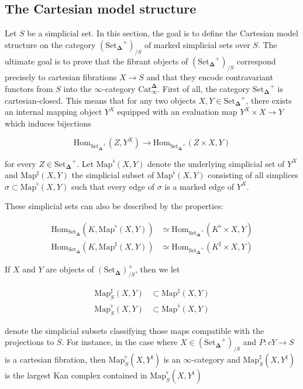 \documentclass[12pt]{amsart}
\newcommand{\8}{\ensuremath{\infty}}
\newcommand{\SSet}{\ensuremath{\text{Set}_{\boldsymbol{\Delta}}}}
\newcommand{\Catinfdel}{\ensuremath{\text{Cat}^{\boldsymbol{\Delta}}_{\infty}}}
\newcommand{\Map}{\ensuremath{\text{Map}}}
\newcommand{\Hom}{\ensuremath{\text{Hom}}}
\begin{document}
\subsection{The Cartesian model structure}
Let $S$ be a simplicial set. In this section, the goal is to define the Cartesian model structure on the category $(\SSet^+)_{/S}$ of marked simplicial sets over $S$. The ultimate goal is to prove that the fibrant objects of $(\SSet^+)_{/S}$ correspond precisely to cartesian fibrations $X \rightarrow S$ and that they encode contravariant functors from $S$ into the \8-category \Catinfdel.
First of all, the category $\SSet^+$ is cartesian-closed. This means that for any two objects $X, Y\in \SSet^+$, there exists an internal mapping object $Y^X$ equipped with an evaluation map $Y^X\times X \rightarrow Y$ which induces bijections

$$
  \Hom_{\SSet^+}(Z, Y^X) \rightarrow \Hom_{\SSet^+}(Z\times X, Y)
$$

for every $Z \in \SSet^+$. Let $\Map^\flat(X, Y)$ denote the underlying simplicial set of $Y^X$ and $\Map^\sharp(X, Y)$ the simplicial subset of $\Map^\flat(X, Y)$ consisting of all simplices $\sigma\subset \Map^\flat(X, Y)$ such that every edge of $\sigma$ is a marked edge of $Y^X$.

These simplicial sets can also be described by the properties:

\begin{align*}
  \Hom_{\SSet}(K, \Map^\flat(X, Y))  & \simeq \Hom_{\SSet^+}(K^\flat\times X, Y)  \\
  \Hom_{\SSet}(K, \Map^\sharp(X, Y)) & \simeq \Hom_{\SSet^+}(K^\sharp\times X, Y)
\end{align*}

If $X$ and $Y$ are objects of $(\SSet)^+_{/S}$, then we let

\begin{align*}
  \Map_S^\sharp(X, Y) & \subset \Map^\sharp(X, Y) \\
  \Map_S^\flat(X, Y)  & \subset \Map^\flat(X, Y)
\end{align*}

denote the simplicial subsets classifying those maps compatible with the projections to $S$. For instance, in the case where $X \in (\SSet^+)_{/S}$ and $P: c Y \rightarrow S$ is a cartesian fibration, then $\Map^\flat_S(X, Y^\natural)$ is an \8-category and $\Map^\sharp_S(X, Y^\natural)$ is the largest Kan complex contained in $\Map^\flat_S(X, Y^\natural)$
\end{document}
